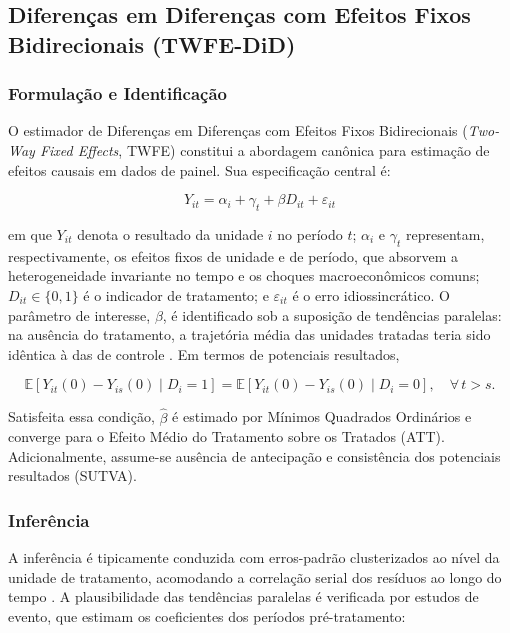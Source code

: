 \documentclass[a4paper,12pt]{article}
\begin{document}
\subsection{Diferenças em Diferenças com Efeitos Fixos Bidirecionais (TWFE-DiD)}

\subsubsection{Formulação e Identificação}

O estimador de Diferenças em Diferenças com Efeitos Fixos Bidirecionais
(\textit{Two-Way Fixed Effects}, TWFE) constitui a abordagem canônica para estimação de
efeitos causais em dados de painel. Sua especificação central é:

\begin{equation}
Y_{it} = \alpha_i + \gamma_t + \beta D_{it} + \varepsilon_{it}
\end{equation}

em que $Y_{it}$ denota o resultado da unidade $i$ no período $t$; $\alpha_i$ e $\gamma_t$
representam, respectivamente, os efeitos fixos de unidade e de período, que absorvem a
heterogeneidade invariante no tempo e os choques macroeconômicos comuns;
$D_{it} \in \{0,1\}$ é o indicador de tratamento; e $\varepsilon_{it}$ é o erro
idiossincrático. O parâmetro de interesse, $\beta$, é identificado sob a suposição de
tendências paralelas: na ausência do tratamento, a trajetória
média das unidades tratadas teria sido idêntica à das de controle \cite{angrist2009}. Em
termos de potenciais resultados,

\begin{equation}
\mathbb{E}[Y_{it}(0) - Y_{is}(0) \mid D_i = 1] =
\mathbb{E}[Y_{it}(0) - Y_{is}(0) \mid D_i = 0], \quad \forall\, t > s.
\end{equation}

Satisfeita essa condição, $\hat{\beta}$ é estimado por Mínimos Quadrados Ordinários e
converge para o Efeito Médio do Tratamento sobre os Tratados (ATT). Adicionalmente,
assume-se ausência de antecipação e consistência dos potenciais
resultados (SUTVA).

\subsubsection{Inferência}

A inferência é tipicamente conduzida com erros-padrão clusterizados ao nível da unidade
de tratamento, acomodando a correlação serial dos resíduos ao longo do tempo
\cite{bertrand2004}. A plausibilidade das tendências paralelas é verificada por estudos de
evento, que estimam os coeficientes dos períodos pré-tratamento:
\end{document}
